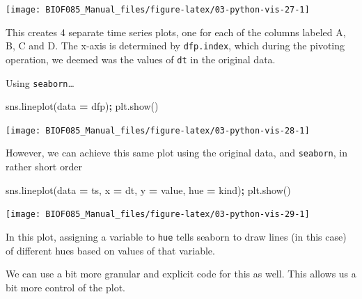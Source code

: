 \documentclass[
  letterpaper,
]{scrbook}
\newenvironment{Shaded}{\begin{snugshade}}{\end{snugshade}}
\newcommand{\NormalTok}[1]{#1}
\newcommand{\OperatorTok}[1]{\textcolor[rgb]{0.81,0.36,0.00}{\textbf{#1}}}
\newcommand{\StringTok}[1]{\textcolor[rgb]{0.31,0.60,0.02}{#1}}
\begin{document}
\begin{center}\texttt{[image: BIOF085\_Manual\_files/figure-latex/03-python-vis-27-1]} \end{center}

This creates 4 separate time series plots, one for each of the columns labeled A, B, C and D. The x-axis is determined by \texttt{dfp.index}, which during the pivoting operation, we deemed was the values of \texttt{dt} in the original data.

Using \texttt{seaborn}\ldots{}

\begin{Shaded}
\begin{Highlighting}[]
\NormalTok{sns.lineplot(data }\OperatorTok{=}\NormalTok{ dfp)}\OperatorTok{;}
\NormalTok{plt.show()}
\end{Highlighting}
\end{Shaded}

\begin{center}\texttt{[image: BIOF085\_Manual\_files/figure-latex/03-python-vis-28-1]} \end{center}

However, we can achieve this same plot using the original data, and \texttt{seaborn}, in rather short order

\begin{Shaded}
\begin{Highlighting}[]
\NormalTok{sns.lineplot(data }\OperatorTok{=}\NormalTok{ ts, x }\OperatorTok{=} \StringTok{\textquotesingle{}dt\textquotesingle{}}\NormalTok{, y }\OperatorTok{=} \StringTok{\textquotesingle{}value\textquotesingle{}}\NormalTok{, hue }\OperatorTok{=} \StringTok{\textquotesingle{}kind\textquotesingle{}}\NormalTok{)}\OperatorTok{;}
\NormalTok{plt.show()}
\end{Highlighting}
\end{Shaded}

\begin{center}\texttt{[image: BIOF085\_Manual\_files/figure-latex/03-python-vis-29-1]} \end{center}

In this plot, assigning a variable to \texttt{hue} tells seaborn to draw lines (in this case) of different hues based on values of that variable.

We can use a bit more granular and explicit code for this as well. This allows us a bit more control of the plot.
\end{document}

